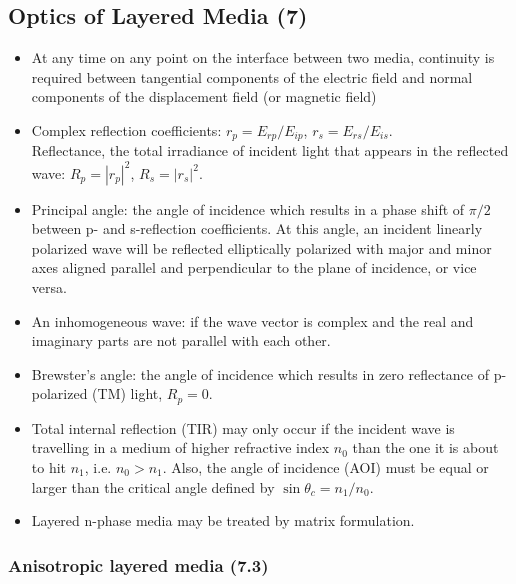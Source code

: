\subsection{Optics of Layered Media (7)}
\begin{itemize}
    \item At any time on any point on the interface between two media, continuity is required between tangential components of the electric field and normal components of the displacement field (or magnetic field)
    
    \item Complex reflection coefficients: $r_p = E_{rp}/E_{ip}$, $r_s = E_{rs}/E_{is}$. \\
    Reflectance, the total irradiance of incident light that appears in the reflected wave: $R_p = |r_p|^2$, $R_s = |r_s|^2$.
    
    \item Principal angle: the angle of incidence which results in a phase shift of $\pi/2$ between p- and s-reflection coefficients. At this angle, an incident linearly polarized wave will be reflected elliptically polarized with major and minor axes aligned parallel and perpendicular to the plane of incidence, or vice versa.
    
    \item An inhomogeneous wave: if the wave vector is complex and the real and imaginary parts are not parallel with each other.
    
    \item Brewster's angle: the angle of incidence which results in zero reflectance of p-polarized (TM) light, $R_p = 0$.
    
    \item Total internal reflection (TIR) may only occur if the incident wave is travelling in a medium of higher refractive index $n_0$ than the one it is about to hit $n_1$, i.e. $n_0>n_1$. Also, the angle of incidence (AOI) must be equal or larger than the critical angle defined by $\sin\theta_c = n_1/n_0$.
    
    \item Layered n-phase media may be treated by matrix formulation.
    
\end{itemize}

\subsubsection{Anisotropic layered media (7.3)}

